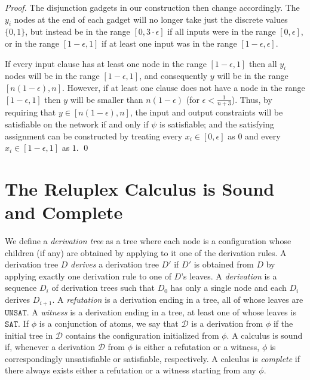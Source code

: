 \documentclass[a4paper]{llncs}
\newcommand{\sat}{\texttt{SAT}}
\newcommand{\unsat}{\texttt{UNSAT}}
\begin{document}
\begin{proof}
The disjunction gadgets in our construction then change accordingly.
The $y_i$ nodes at the end of each
gadget will no longer take just the discrete values
$\{0,1\}$, but instead be in the range $[0,3\cdot \epsilon]$ if all
inputs were in the range $[0,\epsilon]$, or in the range
$[1-\epsilon,1]$ if at least one input was in the range
$[1-\epsilon,\epsilon]$.

If every input clause has at least one node in the range
$[1-\epsilon,1]$ then all $y_i$ nodes will be in the range
$[1-\epsilon,1]$, and consequently $y$ will be in the range
$[n(1-\epsilon), n]$. However, if at least one clause does not have a
node in the range $[1-\epsilon,1]$ then $y$ will be smaller than
$n(1-\epsilon)$ (for $\epsilon < \frac{1}{n+3}$).
Thus, by requiring that $y\in [n(1-\epsilon), n]$, the input and output
constraints will be satisfiable on the network if and only if $\psi$ is satisfiable; and the
satisfying assignment can be constructed by treating every
$x_i\in[0,\epsilon]$ as $0$ and every $x_i\in[1-\epsilon, 1]$ as $1$.
\qed
\end{proof}

\section{The Reluplex Calculus is Sound and Complete}
\label{appendix:soundness}

\newcommand{\derivation}{\mathcal{D}}
\newcommand{\derivationtree}{D}

We define a \emph{derivation tree} as a tree where
each node is a configuration whose children (if any) are obtained by
applying to it one of the derivation rules.  A derivation tree $\derivationtree$ \emph{derives} a
derivation tree $\derivationtree'$ if $\derivationtree'$ is obtained from $\derivationtree$ by applying exactly one
derivation rule to one of $\derivationtree$'s leaves.  A \emph{derivation} is a sequence
$\derivationtree_i$ of derivation trees such that $\derivationtree_0$
has only a single node and each $\derivationtree_i$ derives
$\derivationtree_{i+1}$. 
A \emph{refutation} is a derivation ending in a tree, all of whose leaves are
$\unsat{}$.  A \emph{witness} is a derivation ending in a tree, at least one of
whose leaves is $\sat{}$.
If $\phi$ is a conjunction of atoms, we say that $\derivation$ is a derivation
from $\phi$ if the initial tree in $\derivation$ contains the configuration
initialized from $\phi$.
A calculus is sound if, whenever a derivation $\derivation$ from $\phi$ is
either a refutation or a witness, $\phi$ is correspondingly unsatisfiable or satisfiable,
respectively.  A calculus is \emph{complete} if there always exists either a
refutation or a witness starting from any $\phi$.  
\end{document}
